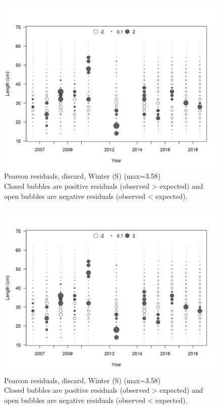 \documentclass[12pt,]{article}
\begin{document}
\begin{figure}
\centering
\includegraphics{r4ss/plots_mod1/comp_lenfit_residsflt3mkt1.png}
\caption{Pearson residuals, discard, Winter (S) (max=3.58)\\
Closed bubbles are positive residuals (observed \textgreater{} expected)
and open bubbles are negative residuals (observed \textless{} expected).
\label{fig:discard_ws_len_pearson}}
\end{figure}

\begin{figure}
\centering
\includegraphics{r4ss/plots_mod1/comp_lenfit_residsflt3mkt1.png}
\caption{Pearson residuals, discard, Winter (S) (max=3.58)\\
Closed bubbles are positive residuals (observed \textgreater{} expected)
and open bubbles are negative residuals (observed \textless{} expected).
\label{fig:discard_ss_len_pearson}}
\end{figure}
\end{document}
